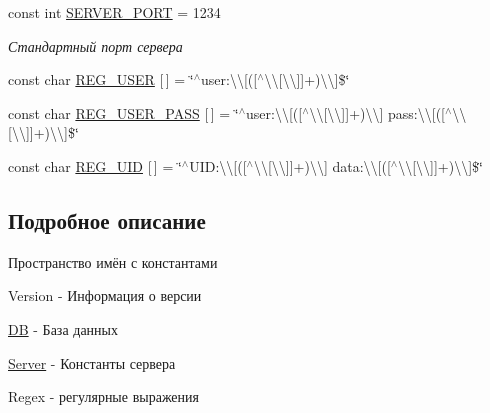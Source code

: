 \begin{DoxyCompactItemize}
const int \mbox{\hyperlink{namespace_b_r_a93dcd985876e063e59cb37eeb4f49bc8}{S\+E\+R\+V\+E\+R\+\_\+\+P\+O\+RT}} = 1234
\begin{DoxyCompactList}\small\item\em Стандартный порт сервера \end{DoxyCompactList}\item 
const char \mbox{\hyperlink{namespace_b_r_adf62830a86680a1b129dc6a865c8ca5f}{R\+E\+G\+\_\+\+U\+S\+ER}} \mbox{[}$\,$\mbox{]} = \char`\"{}$^\wedge$user\+:\textbackslash{}\textbackslash{}\mbox{[}(\mbox{[}$^\wedge$\textbackslash{}\textbackslash{}\mbox{[}\textbackslash{}\textbackslash{}\mbox{]}\mbox{]}+)\textbackslash{}\textbackslash{}\mbox{]}\$\char`\"{}
\item 
const char \mbox{\hyperlink{namespace_b_r_a81134999acb4e2183d0968fad32d055e}{R\+E\+G\+\_\+\+U\+S\+E\+R\+\_\+\+P\+A\+SS}} \mbox{[}$\,$\mbox{]} = \char`\"{}$^\wedge$user\+:\textbackslash{}\textbackslash{}\mbox{[}(\mbox{[}$^\wedge$\textbackslash{}\textbackslash{}\mbox{[}\textbackslash{}\textbackslash{}\mbox{]}\mbox{]}+)\textbackslash{}\textbackslash{}\mbox{]} pass\+:\textbackslash{}\textbackslash{}\mbox{[}(\mbox{[}$^\wedge$\textbackslash{}\textbackslash{}\mbox{[}\textbackslash{}\textbackslash{}\mbox{]}\mbox{]}+)\textbackslash{}\textbackslash{}\mbox{]}\$\char`\"{}
\item 
const char \mbox{\hyperlink{namespace_b_r_a6b288b2197101eea180f726c9ab3195a}{R\+E\+G\+\_\+\+U\+ID}} \mbox{[}$\,$\mbox{]} = \char`\"{}$^\wedge$U\+I\+D\+:\textbackslash{}\textbackslash{}\mbox{[}(\mbox{[}$^\wedge$\textbackslash{}\textbackslash{}\mbox{[}\textbackslash{}\textbackslash{}\mbox{]}\mbox{]}+)\textbackslash{}\textbackslash{}\mbox{]} data\+:\textbackslash{}\textbackslash{}\mbox{[}(\mbox{[}$^\wedge$\textbackslash{}\textbackslash{}\mbox{[}\textbackslash{}\textbackslash{}\mbox{]}\mbox{]}+)\textbackslash{}\textbackslash{}\mbox{]}\$\char`\"{}
\end{DoxyCompactItemize}


\subsection{Подробное описание}
Пространство имён с константами 

Version -\/ Информация о версии

\mbox{\hyperlink{class_d_b}{DB}} -\/ База данных

\mbox{\hyperlink{class_server}{Server}} -\/ Константы сервера

Regex -\/ регулярные выражения 

